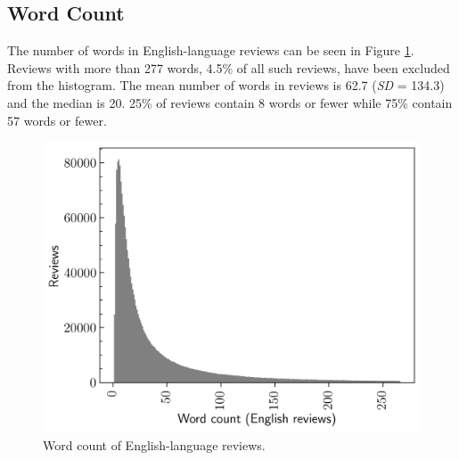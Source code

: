 
\subsection{Word Count}

The number of words in English-language reviews can be seen in Figure \ref{fig:Dataset_HistWordsEng}. Reviews with more than 277 words, 4.5\% of all such reviews, have been excluded from the histogram. The mean number of words in reviews is 62.7 (\textit{SD} = 134.3) and the median is 20. 25\% of reviews contain 8 words or fewer while 75\% contain 57 words or fewer.

\begin{figure}[ht]
    \centering
    \includegraphics[scale=0.55]{figures/03_dataset/14_hist_review_words_en.png}
    \caption{Word count of English-language reviews.}
    \label{fig:Dataset_HistWordsEng}
\end{figure}
